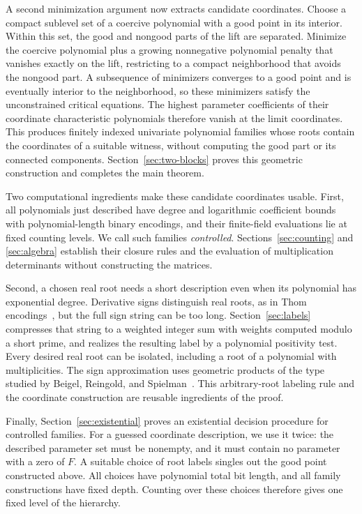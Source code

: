 A second minimization argument now extracts candidate coordinates.
Choose a compact sublevel set of a coercive polynomial with a good
point in its interior. Within this set, the good and nongood parts of
the lift are separated. Minimize the coercive polynomial plus a growing
nonnegative polynomial penalty that vanishes exactly on the lift,
restricting to a compact neighborhood that avoids the nongood part. A subsequence of
minimizers converges to a good point and is eventually interior to the
neighborhood, so these minimizers satisfy the unconstrained critical
equations. The highest parameter coefficients of their coordinate
characteristic polynomials therefore vanish at the limit coordinates.
This produces finitely indexed univariate polynomial families whose roots
contain the coordinates of a suitable witness, without computing the good part or its connected
components. Section~\ref{sec:two-blocks} proves this geometric
construction and completes the main theorem.

Two computational ingredients make these candidate coordinates usable.
First, all polynomials just described have degree and logarithmic
coefficient bounds with polynomial-length binary encodings, and their
finite-field evaluations lie at fixed counting levels. We call such
families \emph{controlled}. Sections~\ref{sec:counting} and
\ref{sec:algebra} establish their closure rules and the evaluation of
multiplication determinants without constructing the matrices.

Second, a chosen real root needs a short description even when its
polynomial has exponential degree. Derivative signs distinguish real
roots, as in Thom encodings~\cite{BasuPollackRoy2006}, but the full sign
string can be too long. Section~\ref{sec:labels} compresses that string
to a weighted integer sum with weights computed modulo a short prime,
and realizes the resulting
label by a polynomial positivity test. Every desired real root can
be isolated, including a root of a polynomial with multiplicities.
The sign approximation uses geometric products of the type studied
by Beigel, Reingold, and Spielman~\cite{BeigelReingoldSpielman1995}.
This arbitrary-root labeling rule and the coordinate construction
are reusable ingredients of the proof.

Finally, Section~\ref{sec:existential} proves an existential decision
procedure for controlled families. For a guessed coordinate description,
we use it twice: the described parameter set must be nonempty, and
it must contain no parameter with a zero of $F$. A suitable choice
of root labels singles out the good point constructed above. All
choices have polynomial total bit length, and all family constructions
have fixed depth. Counting over these choices therefore gives one
fixed level of the hierarchy.
